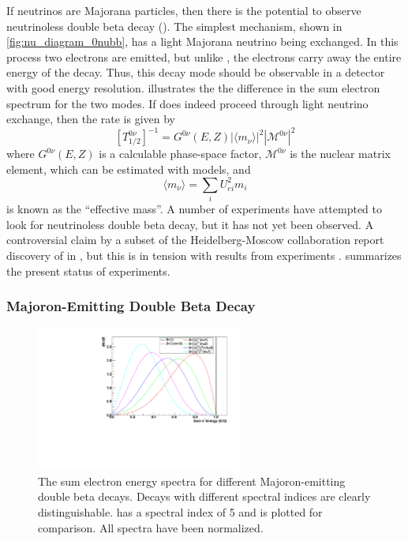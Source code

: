 \documentclass[herrin-thesis.tex]{subfiles}
\begin{document}
If neutrinos are Majorana particles, then there is the potential to observe neutrinoless double beta decay (\zeronu{}). The simplest mechanism, shown in \cref{fig:nu_diagram_0nubb}, has a light Majorana neutrino being exchanged. In this process two electrons are emitted, but unlike \twonu{}, the electrons carry away the entire energy of the decay. Thus, this decay mode should be observable in a detector with good energy resolution.  illustrates the the difference in the sum electron spectrum for the two modes. If \zeronu{} does indeed proceed through light neutrino exchange, then the rate is given by
\begin{equation}
\left [ T^{0\nu}_{1/2} \right ]^{-1} = G^{0\nu}\left(E, Z\right)\left | \langle m_{\nu} \rangle \right |^2\left | \mathcal{M}^{0\nu}\right |^2
\label{eq:nu_zeronu_rate}
\end{equation}
where \(G^{0\nu}(E,Z)\) is a calculable phase-space factor, \( \mathcal{M}^{0\nu}\) is the nuclear matrix element, which can be estimated with models, and
\begin{equation}
\langle m_{\nu} \rangle = \sum_i U_{e i}^2 m_i
\label{eq:nu_meff_def}
\end{equation}
is known as the ``effective mass''. A number of experiments have attempted to look for neutrinoless double beta decay, but it has not yet been observed. A controversial claim by a subset of the Heidelberg-Moscow collaboration report discovery of \zeronu{} in  \cite{KlapdorKleingrothaus:2006ff}, but this is in tension with results from  experiments \cite{Auger:2012ar,Gando:2013fk}.  summarizes the present status of experiments.

\subsubsection{Majoron-Emitting Double Beta Decay}

\begin{figure}[htbp]
	\centering
	\includegraphics[width=0.6\textwidth]{./plots/nu_majoron_spectra}
	\caption[Energy spectra for Majoron-emitting double beta decay modes]{The sum electron energy spectra for different Majoron-emitting double beta decays. Decays with different spectral indices are clearly distinguishable. \twonu{} has a spectral index of 5 and is plotted for comparison. All spectra have been normalized.}
	\label{fig:nu_majoron_spectra}
\end{figure}
\end{document}
